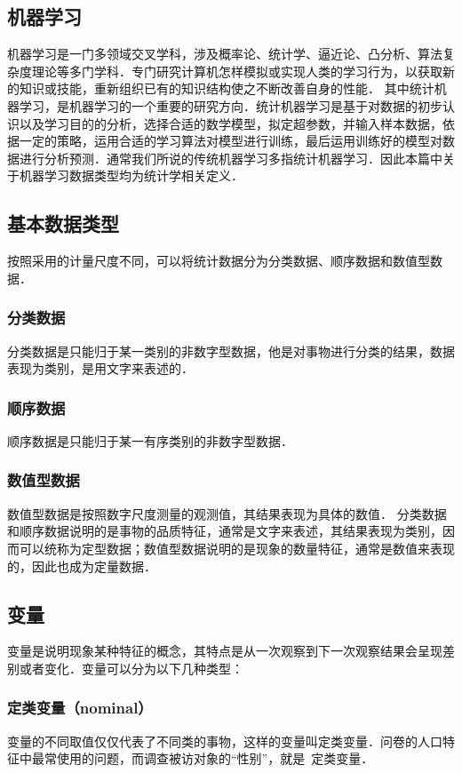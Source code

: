 \subsection{机器学习}
机器学习是一门多领域交叉学科，涉及概率论、统计学、逼近论、凸分析、算法复杂度理论等多门学科．专门研究计算机怎样模拟或实现人类的学习行为，以获取新的知识或技能，重新组织已有的知识结构使之不断改善自身的性能．
其中统计机器学习，是机器学习的一个重要的研究方向．统计机器学习是基于对数据的初步认识以及学习目的的分析，选择合适的数学模型，拟定超参数，并输入样本数据，依据一定的策略，运用合适的学习算法对模型进行训练，最后运用训练好的模型对数据进行分析预测．通常我们所说的传统机器学习多指统计机器学习．因此本篇中关于机器学习数据类型均为统计学相关定义．

\subsection{基本数据类型}
按照采用的计量尺度不同，可以将统计数据分为分类数据、顺序数据和数值型数据．
\subsubsection{分类数据}
分类数据是只能归于某一类别的非数字型数据，他是对事物进行分类的结果，数据表现为类别，是用文字来表述的．
\subsubsection{顺序数据}
顺序数据是只能归于某一有序类别的非数字型数据．
\subsubsection{数值型数据}
数值型数据是按照数字尺度测量的观测值，其结果表现为具体的数值．
分类数据和顺序数据说明的是事物的品质特征，通常是文字来表述，其结果表现为类别，因而可以统称为定型数据；数值型数据说明的是现象的数量特征，通常是数值来表现的，因此也成为定量数据．
\subsection{变量}
变量是说明现象某种特征的概念，其特点是从一次观察到下一次观察结果会呈现差别或者变化．变量可以分为以下几种类型：
\subsubsection{定类变量（nominal）}
变量的不同取值仅仅代表了不同类的事物，这样的变量叫定类变量．问卷的人口特征中最常使用的问题，而调查被访对象的“性别”，就是 定类变量．
